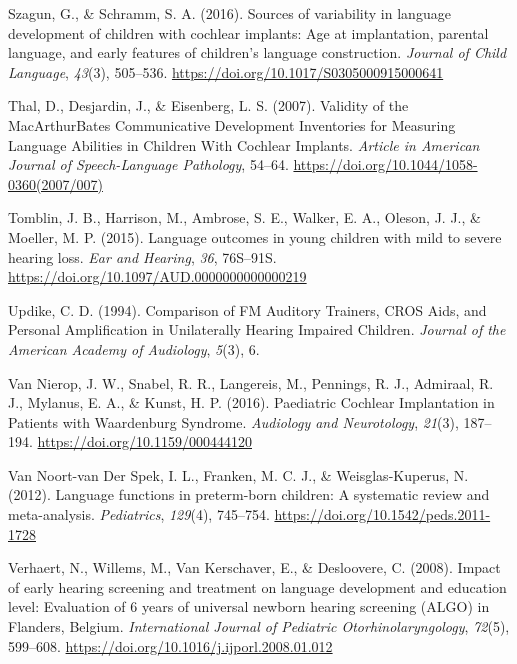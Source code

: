 \documentclass[english,man]{apa6}
\begin{document}
\leavevmode\hypertarget{ref-szagun2016}{}%
Szagun, G., \& Schramm, S. A. (2016). Sources of variability in language development of children with cochlear implants: Age at implantation, parental language, and early features of children's language construction. \emph{Journal of Child Language}, \emph{43}(3), 505--536. \url{https://doi.org/10.1017/S0305000915000641}

\leavevmode\hypertarget{ref-thal2007}{}%
Thal, D., Desjardin, J., \& Eisenberg, L. S. (2007). Validity of the MacArthurBates Communicative Development Inventories for Measuring Language Abilities in Children With Cochlear Implants. \emph{Article in American Journal of Speech-Language Pathology}, 54--64. \url{https://doi.org/10.1044/1058-0360(2007/007)}

\leavevmode\hypertarget{ref-tomblin2015}{}%
Tomblin, J. B., Harrison, M., Ambrose, S. E., Walker, E. A., Oleson, J. J., \& Moeller, M. P. (2015). Language outcomes in young children with mild to severe hearing loss. \emph{Ear and Hearing}, \emph{36}, 76S--91S. \url{https://doi.org/10.1097/AUD.0000000000000219}

\leavevmode\hypertarget{ref-updike1994}{}%
Updike, C. D. (1994). Comparison of FM Auditory Trainers, CROS Aids, and Personal Amplification in Unilaterally Hearing Impaired Children. \emph{Journal of the American Academy of Audiology}, \emph{5}(3), 6.

\leavevmode\hypertarget{ref-vannierop2016}{}%
Van Nierop, J. W., Snabel, R. R., Langereis, M., Pennings, R. J., Admiraal, R. J., Mylanus, E. A., \& Kunst, H. P. (2016). Paediatric Cochlear Implantation in Patients with Waardenburg Syndrome. \emph{Audiology and Neurotology}, \emph{21}(3), 187--194. \url{https://doi.org/10.1159/000444120}

\leavevmode\hypertarget{ref-vannoort-vanderspek2012}{}%
Van Noort-van Der Spek, I. L., Franken, M. C. J., \& Weisglas-Kuperus, N. (2012). Language functions in preterm-born children: A systematic review and meta-analysis. \emph{Pediatrics}, \emph{129}(4), 745--754. \url{https://doi.org/10.1542/peds.2011-1728}

\leavevmode\hypertarget{ref-verhaert2008}{}%
Verhaert, N., Willems, M., Van Kerschaver, E., \& Desloovere, C. (2008). Impact of early hearing screening and treatment on language development and education level: Evaluation of 6 years of universal newborn hearing screening (ALGO) in Flanders, Belgium. \emph{International Journal of Pediatric Otorhinolaryngology}, \emph{72}(5), 599--608. \url{https://doi.org/10.1016/j.ijporl.2008.01.012}
\end{document}
